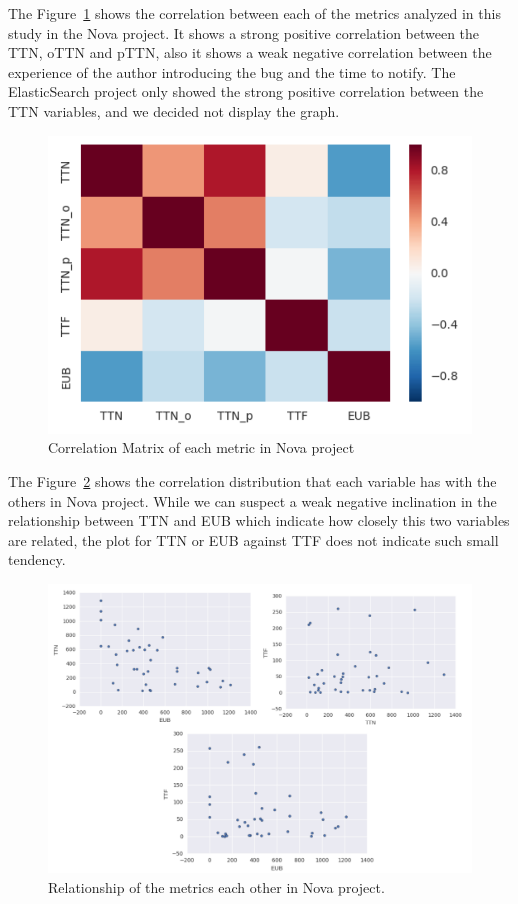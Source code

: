 \documentclass[10pt, conference]{IEEEtran}
\begin{document}
The Figure~\ref{fig:correlation} shows the correlation between each of the metrics analyzed in this study in the Nova project. It shows a strong positive correlation between the TTN, oTTN and pTTN, also it shows a weak negative correlation between the experience of the author introducing the bug and the time to notify. The ElasticSearch project only showed the strong positive correlation between the TTN variables, and we decided not display the graph.

\begin{figure}[ht]
\centering
\includegraphics[width=\columnwidth]{correlationMatrix.png}
\caption{Correlation Matrix of each metric in Nova project}
\label{fig:correlation}       %
\end{figure}

The Figure~\ref{fig:graph} shows the correlation distribution that each variable has with the others in Nova project. While we can suspect a weak negative inclination in the relationship between TTN and EUB which indicate how closely this two variables are related, the plot for TTN or EUB against TTF does not indicate such small tendency.

\begin{figure}[ht]
\centering
\includegraphics[width=\columnwidth]{DistributionNova_b.png}
\caption{ Relationship of the metrics each other in Nova project. 
}
\label{fig:graph}       %
\end{figure}
\end{document}
